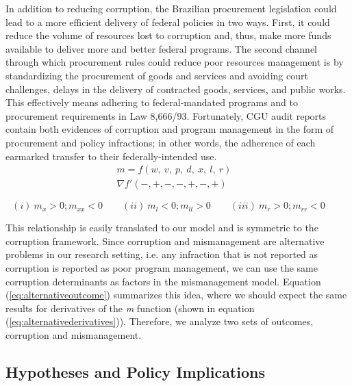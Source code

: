 \documentclass[11pt]{article}
\newcommand{\hypopen}{Comparing procurement calls}
\begin{document}
In addition to reducing corruption, the Brazilian procurement legislation could lead to a more efficient delivery of federal policies in two ways. First, it could reduce the volume of resources lost to corruption and, thus, make more funds available to deliver more and better federal programs. The second channel through which procurement rules could reduce poor resources management is by standardizing the procurement of goods and services and avoiding court challenges, delays in the delivery of contracted goods, services, and public works. This effectively means adhering to federal-mandated programs and to procurement requirements in Law 8,666/93. Fortunately, CGU audit reports contain both evidences of corruption and program management in the form of procurement and policy infractions; in other words, the adherence of each earmarked transfer to their federally-intended use.
\begin{equation} \label{eq:alternativeoutcome}
  \begin{aligned}
    m = f(w,\ v,\ p,\ d,\ x,\ l,\ r)& \\
    \nabla f'(-,+,-,-,+,-,+)&
  \end{aligned}
\end{equation}

\begin{equation} \label{eq:alternativederivatives}
  (i) \   m_{x} > 0; m_{xx} < 0 \qquad
  (ii) \  m_{l} < 0; m_{ll} > 0 \qquad
  (iii) \ m_{r} > 0; m_{rr} < 0 \qquad
\end{equation}

This relationship is easily translated to our model and is symmetric to the corruption framework. Since corruption and mismanagement are alternative problems in our research setting, i.e. any infraction that is not reported as corruption is reported as poor program management, we can use the same corruption determinants as factors in the mismanagement model. Equation (\ref{eq:alternativeoutcome}) summarizes this idea, where we should expect the same results for derivatives of the \emph{m} function (shown in equation (\ref{eq:alternativederivatives})). Therefore, we analyze two sets of outcomes, corruption and mismanagement.

\subsection{Hypotheses and Policy Implications} \label{subsec:hypotheses}
\end{document}
